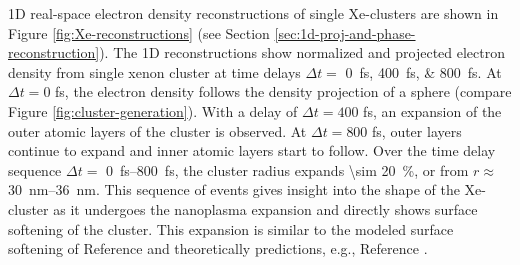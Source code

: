 1D real-space electron density reconstructions of single Xe-clusters are shown in Figure \ref{fig:Xe-reconstructions} (see Section \ref{sec:1d-proj-and-phase-reconstruction}). The 1D reconstructions show normalized and projected electron density from single xenon cluster at time delays $\Delta t=$ \SIlist{0;400;800}{\femto\second}. At $\Delta t = 0$ fs, the electron density follows the density projection of a sphere (compare Figure \ref{fig:cluster-generation}). With a delay of $\Delta t = 400$ fs, an expansion of the outer atomic layers of the cluster is observed. At $\Delta t = 800$ fs, outer layers continue to expand and inner atomic layers start to follow. Over the time delay sequence $\Delta t=$ \SIrange{0}{800}{\femto\second}, the cluster radius expands \SI{\sim 20}{\percent}, or from $r\approx$ \SIrange{30}{36}{\nano\meter}. This sequence of events gives insight into the shape of the Xe-cluster as it undergoes the nanoplasma expansion and directly shows surface softening of the cluster. This expansion is similar to the modeled surface softening of Reference \cite{Gorkhover-2016-NatPho} and theoretically predictions, e.g., Reference \citep{Hau-Riege-2004-PRE}.\\[1\baselineskip]
